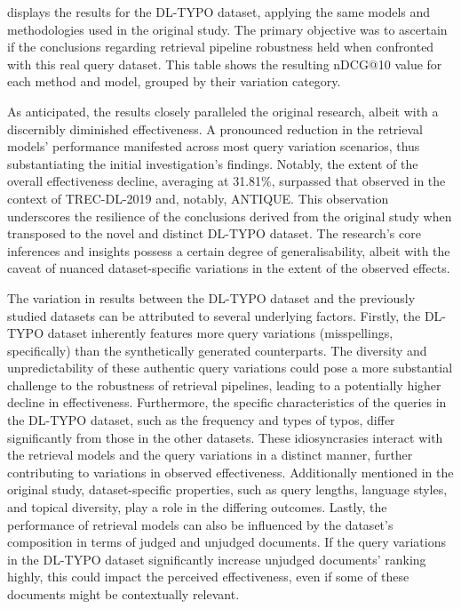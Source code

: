  displays the results for the DL-TYPO dataset, applying the same models and methodologies used in the original study. The primary objective was to ascertain if the conclusions regarding retrieval pipeline robustness held when confronted with this real query dataset. This table shows the resulting nDCG@10 value for each method and model, grouped by their variation category.

As anticipated, the results closely paralleled the original research, albeit with a discernibly diminished effectiveness. A pronounced reduction in the retrieval models' performance manifested across most query variation scenarios, thus substantiating the initial investigation's findings. Notably, the extent of the overall effectiveness decline, averaging at 31.81\%, surpassed that observed in the context of TREC-DL-2019 and, notably, ANTIQUE. This observation underscores the resilience of the conclusions derived from the original study when transposed to the novel and distinct DL-TYPO dataset. The research's core inferences and insights possess a certain degree of generalisability, albeit with the caveat of nuanced dataset-specific variations in the extent of the observed effects.

The variation in results between the DL-TYPO dataset and the previously studied datasets can be attributed to several underlying factors. Firstly, the DL-TYPO dataset inherently features more query variations (misspellings, specifically) than the synthetically generated counterparts. The diversity and unpredictability of these authentic query variations could pose a more substantial challenge to the robustness of retrieval pipelines, leading to a potentially higher decline in effectiveness. Furthermore, the specific characteristics of the queries in the DL-TYPO dataset, such as the frequency and types of typos, differ significantly from those in the other datasets. These idiosyncrasies interact with the retrieval models and the query variations in a distinct manner, further contributing to variations in observed effectiveness.
Additionally mentioned in the original study, dataset-specific properties, such as query lengths, language styles, and topical diversity, play a role in the differing outcomes. Lastly, the performance of retrieval models can also be influenced by the dataset's composition in terms of judged and unjudged documents. If the query variations in the DL-TYPO dataset significantly increase unjudged documents' ranking highly, this could impact the perceived effectiveness, even if some of these documents might be contextually relevant.

